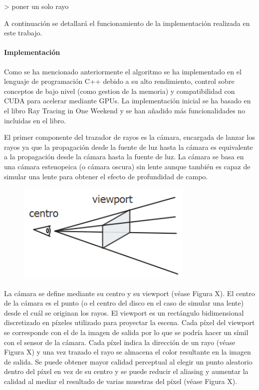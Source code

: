 \documentclass[10pt, a4paper]{article}
\begin{document}
> poner un solo rayo

A continuación se detallará el funcionamiento de la implementación realizada en este trabajo.

\paragraph{Implementación}

Como se ha mencionado anteriormente el algoritmo se ha implementado en el lenguaje de programación C++ debido a su alto rendimiento, control sobre conceptos de bajo nivel (como gestion de la memoria) y compatibilidad con CUDA para acelerar mediante GPUs. La implementación inicial se ha basado en el libro Ray Tracing in One Weekend \cite{Shirley:2024} y se han añadido más funcionalidades no incluidas en el libro.

El primer componente del trazador de rayos es la cámara, encargada de lanzar los rayos ya que la propagación desde la fuente de luz hasta la cámara es equivalente a la propagación desde la cámara hasta la fuente de luz. La cámara se basa en una cámara estenopeica (o cámara oscura) sin lente aunque también es capaz de simular una lente para obtener el efecto de profundidad de campo.

\begin{figure}[h]
     \centering 
    \includegraphics[width=0.75\textwidth]{camera}

\end{figure}

    \caption{Diagrama del modelo de cámara utilizado, basado en una cámara estenopeica.}

La cámara se define mediante su centro y su viewport (véase Figura X). El centro de la cámara es el punto (o el centro del disco en el caso de simular una lente) desde el cuál se originan los rayos. El viewport es un rectángulo bidimensional discretizado en píxeles utilizado para proyectar la escena. Cada píxel del viewport se corresponde con el de la imagen de salida por lo que se podría hacer un símil con el sensor de la cámara. Cada píxel indica la dirección de un rayo (véase Figura X) y una vez trazado el rayo se almacena el color resultante en la imagen de salida. Se puede obtener mayor calidad perceptual al elegir un punto aleatorio dentro del píxel en vez de su centro y se puede reducir el aliasing y aumentar la calidad al mediar el resultado de varias muestras del píxel (véase Figura X).
\end{document}
